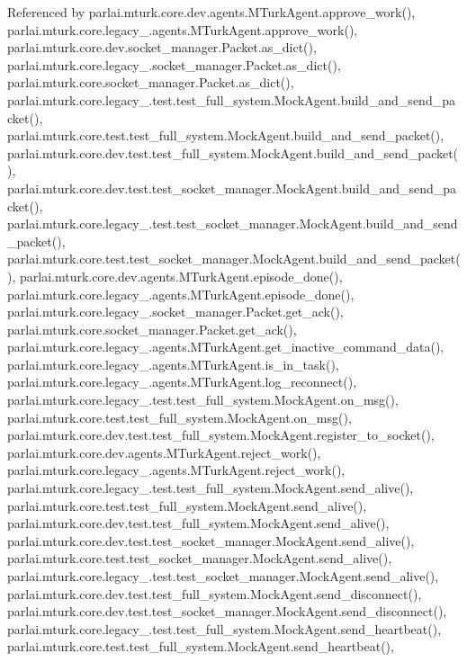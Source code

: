 Referenced by parlai.\+mturk.\+core.\+dev.\+agents.\+M\+Turk\+Agent.\+approve\+\_\+work(), parlai.\+mturk.\+core.\+legacy\+\_.\+agents.\+M\+Turk\+Agent.\+approve\+\_\+work(), parlai.\+mturk.\+core.\+dev.\+socket\+\_\+manager.\+Packet.\+as\+\_\+dict(), parlai.\+mturk.\+core.\+legacy\+\_.\+socket\+\_\+manager.\+Packet.\+as\+\_\+dict(), parlai.\+mturk.\+core.\+socket\+\_\+manager.\+Packet.\+as\+\_\+dict(), parlai.\+mturk.\+core.\+legacy\+\_.\+test.\+test\+\_\+full\+\_\+system.\+Mock\+Agent.\+build\+\_\+and\+\_\+send\+\_\+packet(), parlai.\+mturk.\+core.\+test.\+test\+\_\+full\+\_\+system.\+Mock\+Agent.\+build\+\_\+and\+\_\+send\+\_\+packet(), parlai.\+mturk.\+core.\+dev.\+test.\+test\+\_\+full\+\_\+system.\+Mock\+Agent.\+build\+\_\+and\+\_\+send\+\_\+packet(), parlai.\+mturk.\+core.\+dev.\+test.\+test\+\_\+socket\+\_\+manager.\+Mock\+Agent.\+build\+\_\+and\+\_\+send\+\_\+packet(), parlai.\+mturk.\+core.\+legacy\+\_.\+test.\+test\+\_\+socket\+\_\+manager.\+Mock\+Agent.\+build\+\_\+and\+\_\+send\+\_\+packet(), parlai.\+mturk.\+core.\+test.\+test\+\_\+socket\+\_\+manager.\+Mock\+Agent.\+build\+\_\+and\+\_\+send\+\_\+packet(), parlai.\+mturk.\+core.\+dev.\+agents.\+M\+Turk\+Agent.\+episode\+\_\+done(), parlai.\+mturk.\+core.\+legacy\+\_.\+agents.\+M\+Turk\+Agent.\+episode\+\_\+done(), parlai.\+mturk.\+core.\+legacy\+\_.\+socket\+\_\+manager.\+Packet.\+get\+\_\+ack(), parlai.\+mturk.\+core.\+socket\+\_\+manager.\+Packet.\+get\+\_\+ack(), parlai.\+mturk.\+core.\+legacy\+\_.\+agents.\+M\+Turk\+Agent.\+get\+\_\+inactive\+\_\+command\+\_\+data(), parlai.\+mturk.\+core.\+legacy\+\_.\+agents.\+M\+Turk\+Agent.\+is\+\_\+in\+\_\+task(), parlai.\+mturk.\+core.\+legacy\+\_.\+agents.\+M\+Turk\+Agent.\+log\+\_\+reconnect(), parlai.\+mturk.\+core.\+legacy\+\_.\+test.\+test\+\_\+full\+\_\+system.\+Mock\+Agent.\+on\+\_\+msg(), parlai.\+mturk.\+core.\+test.\+test\+\_\+full\+\_\+system.\+Mock\+Agent.\+on\+\_\+msg(), parlai.\+mturk.\+core.\+dev.\+test.\+test\+\_\+full\+\_\+system.\+Mock\+Agent.\+register\+\_\+to\+\_\+socket(), parlai.\+mturk.\+core.\+dev.\+agents.\+M\+Turk\+Agent.\+reject\+\_\+work(), parlai.\+mturk.\+core.\+legacy\+\_.\+agents.\+M\+Turk\+Agent.\+reject\+\_\+work(), parlai.\+mturk.\+core.\+legacy\+\_.\+test.\+test\+\_\+full\+\_\+system.\+Mock\+Agent.\+send\+\_\+alive(), parlai.\+mturk.\+core.\+test.\+test\+\_\+full\+\_\+system.\+Mock\+Agent.\+send\+\_\+alive(), parlai.\+mturk.\+core.\+dev.\+test.\+test\+\_\+full\+\_\+system.\+Mock\+Agent.\+send\+\_\+alive(), parlai.\+mturk.\+core.\+dev.\+test.\+test\+\_\+socket\+\_\+manager.\+Mock\+Agent.\+send\+\_\+alive(), parlai.\+mturk.\+core.\+test.\+test\+\_\+socket\+\_\+manager.\+Mock\+Agent.\+send\+\_\+alive(), parlai.\+mturk.\+core.\+legacy\+\_.\+test.\+test\+\_\+socket\+\_\+manager.\+Mock\+Agent.\+send\+\_\+alive(), parlai.\+mturk.\+core.\+dev.\+test.\+test\+\_\+full\+\_\+system.\+Mock\+Agent.\+send\+\_\+disconnect(), parlai.\+mturk.\+core.\+dev.\+test.\+test\+\_\+socket\+\_\+manager.\+Mock\+Agent.\+send\+\_\+disconnect(), parlai.\+mturk.\+core.\+legacy\+\_.\+test.\+test\+\_\+full\+\_\+system.\+Mock\+Agent.\+send\+\_\+heartbeat(), parlai.\+mturk.\+core.\+test.\+test\+\_\+full\+\_\+system.\+Mock\+Agent.\+send\+\_\+heartbeat(), 